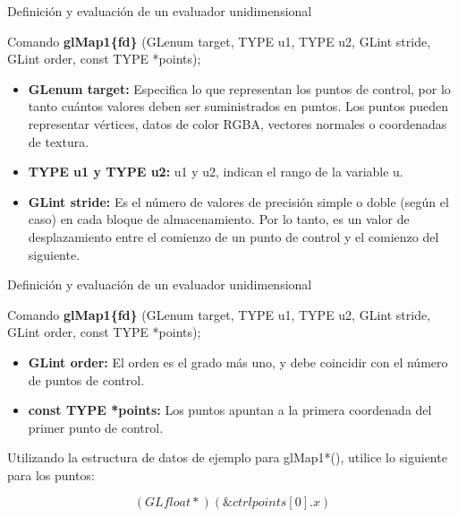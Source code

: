 \documentclass[10.5pt]{beamer}
\begin{document}
\begin{frame}{Definición y evaluación de un evaluador unidimensional}

   \begin{alertblock}{Comando}
   \small
    \textbf{glMap1\{fd\}} (GLenum target, TYPE u1, TYPE u2, GLint stride,
     GLint order, const TYPE *points);
   \end{alertblock}

   \begin{itemize}
   \justifying
       \item \textbf{GLenum target:} Especifica lo que representan los puntos de control, por lo tanto cuántos valores deben ser suministrados en puntos. Los puntos pueden representar vértices, datos de color RGBA, vectores normales o coordenadas de textura.

       \item \textbf{TYPE u1 y TYPE u2:} u1 y u2, indican el rango de la variable u.

       \item \textbf{GLint stride:} Es el número de valores de precisión simple o doble (según el caso) en cada bloque de almacenamiento. Por lo tanto, es un valor de desplazamiento entre el comienzo de un punto de control y el comienzo del siguiente.
   \end{itemize}

\end{frame}
\begin{frame}{Definición y evaluación de un evaluador unidimensional}

   \begin{alertblock}{Comando}
   \small
    \textbf{glMap1\{fd\}} (GLenum target, TYPE u1, TYPE u2, GLint stride,
     GLint order, const TYPE *points);
   \end{alertblock}

   \begin{itemize}
     \justifying
       \item \textbf{ GLint order:} El orden es el grado más uno, y debe coincidir con el número de puntos de control.

       \item \textbf{ const TYPE *points:} Los puntos apuntan a la primera coordenada del primer punto de control.
   \end{itemize}
  Utilizando la estructura de datos de ejemplo para glMap1*(), utilice lo siguiente para los puntos:
    \begin{alertblock}{}
   \small
   \begin{equation*}
       (GLfloat *) (\&ctrlpoints[0].x)
   \end{equation*}
   \end{alertblock}
\end{frame}
\end{document}
